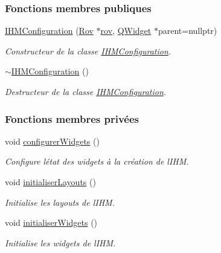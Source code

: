 \subsubsection*{Fonctions membres publiques}
\begin{DoxyCompactItemize}
\item 
\hyperlink{class_i_h_m_configuration_a1532c281d170546071352cfe05feb1b8}{I\+H\+M\+Configuration} (\hyperlink{class_rov}{Rov} $\ast$\hyperlink{class_i_h_m_configuration_a75a7e5b7312d9eb3377bc96372fc0b3a}{rov}, \hyperlink{class_q_widget}{Q\+Widget} $\ast$parent=nullptr)
\begin{DoxyCompactList}\small\item\em Constructeur de la classe \hyperlink{class_i_h_m_configuration}{I\+H\+M\+Configuration}. \end{DoxyCompactList}\item 
\hyperlink{class_i_h_m_configuration_a59e2b693b4a1f1a8a6af3227996c3808}{$\sim$\+I\+H\+M\+Configuration} ()
\begin{DoxyCompactList}\small\item\em Destructeur de la classe \hyperlink{class_i_h_m_configuration}{I\+H\+M\+Configuration}. \end{DoxyCompactList}\end{DoxyCompactItemize}
\subsubsection*{Fonctions membres privées}
\begin{DoxyCompactItemize}
\item 
void \hyperlink{class_i_h_m_configuration_a9ed73ca9584b8d9f33ad341081113a55}{configurer\+Widgets} ()
\begin{DoxyCompactList}\small\item\em Configure l\textquotesingle{}état des widgets à la création de l\textquotesingle{}I\+HM. \end{DoxyCompactList}\item 
void \hyperlink{class_i_h_m_configuration_ab76abe78fff3b7945b675acddbd320f0}{initialiser\+Layouts} ()
\begin{DoxyCompactList}\small\item\em Initialise les layouts de l\textquotesingle{}I\+HM. \end{DoxyCompactList}\item 
void \hyperlink{class_i_h_m_configuration_a76fe56bbd88aef5581186e05fb4ae67f}{initialiser\+Widgets} ()
\begin{DoxyCompactList}\small\item\em Initialise les widgets de l\textquotesingle{}I\+HM. \end{DoxyCompactList}\end{DoxyCompactItemize}
